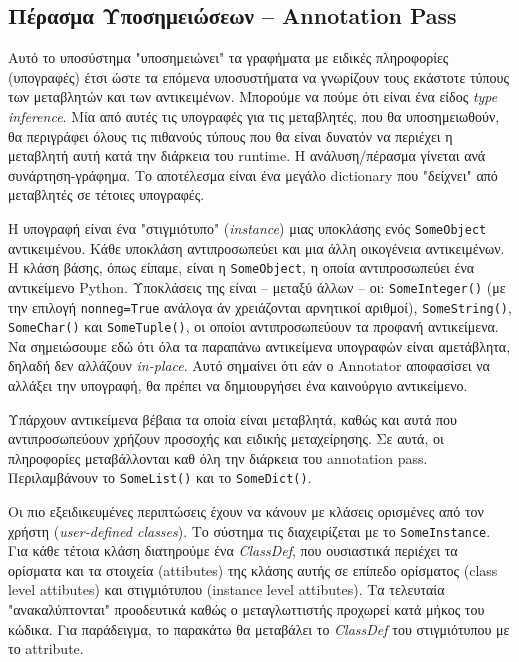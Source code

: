 \subsection{Πέρασμα Υποσημειώσεων – Annotation Pass}

Αυτό το υποσύστημα "υποσημειώνει" τα γραφήματα με ειδικές πληροφορίες
(υπογραφές) έτσι ώστε τα επόμενα υποσυστήματα να γνωρίζουν τους εκάστοτε τύπους
των μεταβλητών και των αντικειμένων. Μπορούμε να πούμε ότι είναι ένα είδος
\textit{type inference}. Μία από αυτές τις υπογραφές για τις μεταβλητές, που θα
υποσημειωθούν, θα περιγράφει όλους τις πιθανούς τύπους που θα είναι δυνατόν να
περιέχει η μεταβλητή αυτή κατά την διάρκεια του runtime. Η ανάλυση/πέρασμα
γίνεται ανά συνάρτηση-γράφημα. Το αποτέλεσμα είναι ένα μεγάλο dictionary που
"δείχνει" από μεταβλητές σε τέτοιες υπογραφές.

Η υπογραφή είναι ένα "στιγμιότυπο" (\textit{instance}) μιας υποκλάσης ενός
\texttt{SomeObject} αντικειμένου. Κάθε υποκλάση αντιπροσωπεύει και μια άλλη
οικογένεια αντικειμένων. Η κλάση βάσης, όπως είπαμε, είναι η
\texttt{SomeObject}, η οποία αντιπροσωπεύει ένα αντικείμενο Python. Υποκλάσεις
της είναι – μεταξύ άλλων – οι: \texttt{SomeInteger()} (με την επιλογή
\texttt{nonneg=True} ανάλογα άν χρειάζονται αρνητικοί αριθμοί),
\texttt{SomeString()}, \texttt{SomeChar()} και \texttt{SomeTuple()}, οι οποίοι
αντιπροσωπεύουν τα προφανή αντικείμενα. Να σημειώσουμε εδώ ότι όλα τα παραπάνω 
αντικείμενα υπογραφών είναι αμετάβλητα, δηλαδή δεν αλλάζουν \textit{in-place}. 
Αυτό σημαίνει ότι εάν ο Annotator αποφασίσει να αλλάξει την υπογραφή, θα 
πρέπει να δημιουργήσει ένα καινούργιο αντικείμενο.

Υπάρχουν αντικείμενα βέβαια τα οποία είναι μεταβλητά, καθώς και αυτά που
αντιπροσωπεύουν χρήζουν προσοχής και ειδικής μεταχείρησης. Σε αυτά, οι 
πληροφορίες μεταβάλλονται καθ όλη την διάρκεια του annotation pass.
Περιλαμβάνουν το \texttt{SomeList()} και το \texttt{SomeDict()}.

Οι πιο εξειδικευμένες περιπτώσεις έχουν να κάνουν με κλάσεις ορισμένες από τον
χρήστη (\textit{user-defined classes}). Το σύστημα τις διαχειρίζεται με το
\texttt{SomeInstance}. Για κάθε τέτοια κλάση διατηρούμε ένα \textit{ClassDef},
που ουσιαστικά περιέχει τα ορίσματα και τα στοιχεία (attibutes) της κλάσης αυτής
σε επίπεδο ορίσματος (class level attibutes) και στιγμιότυπου (instance level
attibutes). Τα τελευταία "ανακαλύπτονται" προοδευτικά καθώς ο μεταγλωττιστής
προχωρεί κατά μήκος του κώδικα. Για παράδειγμα, το παρακάτω θα μεταβάλει το
\textit{ClassDef} του στιγμιότυπου με το attribute.

